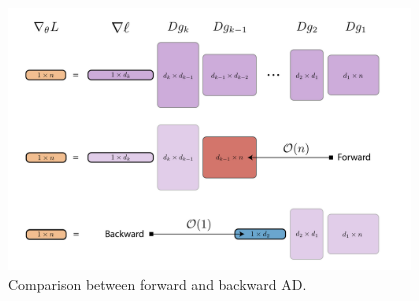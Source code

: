 \begin{figure}
    \centering
    \includegraphics[width=0.95\textwidth]{figures/VJP-JVP.png}
    \caption{Comparison between forward and backward AD.}
    \label{fig:vjp-jvp}
\end{figure}